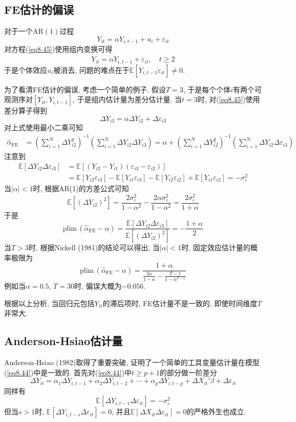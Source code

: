 \documentclass[cn, 12pt, math=mtpro2, bibstyle=apa, blue, twocol]{elegantbook}
\newcommand{\E}{\mathbb{E}}
\begin{document}
\subsection{FE估计的偏误}
对于一个$\text{AR}(1)$过程
\begin{equation}\label{eq8.45}
  Y_{it}=\alpha Y_{i,t-1}+u_i+\varepsilon_{it}
\end{equation}
对方程(\ref{eq8.45})使用组内变换可得
$$\dot{Y}_{it}=\alpha\dot{Y}_{i,t-1}+\dot{\varepsilon}_{it},\quad t\ge2$$
于是个体效应$u_i$被消去, 问题的难点在于$\E[\dot{Y}_{i,t-1}\dot{\varepsilon}_{it}]\neq0$.

为了看清FE估计的偏误, 考虑一个简单的例子. 假设$T=3$, 于是每个个体$i$有两个可观测序对$[Y_{it},Y_{i,t-1}]$, 于是组内估计量为差分估计量. 当$t=3$时, 对(\ref{eq8.45})使用差分算子得到
\begin{equation}\label{eq8.46}
  \Delta Y_{i3}=\alpha\Delta Y_{i2}+\Delta\varepsilon_{i3}
\end{equation}
对上式使用最小二乘可知
\begin{align*}
\hat{\alpha}_{\text{FE}}&=\left(\sum_{i=1}^{N}\Delta Y_{i2}^2\right)^{-1}\left(\sum_{i=1}^{N}\Delta Y_{i2}\Delta Y_{i3}\right)=\alpha+\left(\sum_{i=1}^{N}\Delta Y_{i2}^2\right)^{-1}\left(\sum_{i=1}^{N}\Delta Y_{i2}\Delta \varepsilon_{i3}\right)
\end{align*}
注意到
\begin{align*}
\E[\Delta Y_{i2}\Delta \varepsilon_{i3}]&=\E[(Y_{i2}-Y_{i1})(\varepsilon_{i3}-\varepsilon_{i2})] \\
&=\E[Y_{i2}\varepsilon_{i3}]-\E[Y_{i1}\varepsilon_{i3}]-\E[Y_{i2}\varepsilon_{i2}]+\E[Y_{i1}\varepsilon_{i2}]=-\sigma_\varepsilon^2
\end{align*}
当$|\alpha|<1$时, 根据AR(1)的方差公式可知
$$\E[(\Delta Y_{i2})^2]=\frac{2\sigma_\varepsilon^2}{1-\alpha^2}-\frac{2\alpha\sigma_\varepsilon^2}{1-\alpha^2}=\frac{2\sigma_\varepsilon^2}{1+\alpha}$$
于是
$$\text{plim}\,(\hat{\alpha}_{\text{FE}}-\alpha)=\frac{\E[\Delta Y_{i2}\Delta \varepsilon_{i3}]}{\E[(\Delta Y_{i2})^2]}=-\frac{1+\alpha}{2}$$
当$T>3$时, 根据Nickell (1981)的结论可以得出, 当$|\alpha|<1$时, 固定效应估计量的概率极限为
$$\text{plim}\,(\hat{\alpha}_{\text{FE}}-\alpha)=\frac{1+\alpha}{\displaystyle\frac{2\alpha}{1-\alpha}-\frac{T-1}{1-\alpha^{T-1}}}$$
例如当$\alpha=0.5$, $T=30$时, 偏误大概为$-0.056$.

根据以上分析, 当回归元包括$Y_{it}$的滞后项时, FE估计量不是一致的, 即使时间维度$T$非常大.
\subsection{Anderson-Hsiao估计量}
Anderson-Hsiao (1982)取得了重要突破, 证明了一个简单的工具变量估计量在模型(\ref{eq8.44})中是一致的. 首先对(\ref{eq8.44})中$t\geq p+1$的部分做一阶差分
\begin{equation}\label{eq8.48}
  \Delta Y_{it}=\alpha_1\Delta Y_{i,t-1}+\alpha_2\Delta Y_{i,t-2}+\cdots+\alpha_p\Delta Y_{i,t-p}+\Delta X_{it}'\beta+\Delta\varepsilon_{it}
\end{equation}
同样有
$$\E[\Delta Y_{i,t-1}\Delta\varepsilon_{it}]=-\sigma_\varepsilon^2$$
但当$s>1$时, $\E[\Delta Y_{i,t-s}\Delta \varepsilon_{it}]=0$, 并且$\E[\Delta X_{it}\Delta\varepsilon_{it}]=0$的严格外生也成立.
\end{document}
